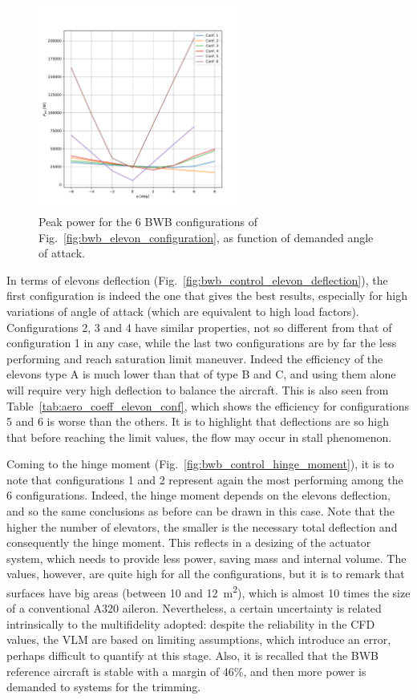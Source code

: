 \begin{figure}[!h]
	\centering
	\includegraphics[keepaspectratio, width=0.6\textwidth]{images/chap4/bwb_control_peak_power}
	\caption{Peak power for the 6 BWB configurations of Fig.~\ref{fig:bwb_elevon_configuration}, as function of demanded angle of attack.}
	\label{fig:bwb_control_peak_power}
\end{figure}

In terms of elevons deflection (Fig.~\ref{fig:bwb_control_elevon_deflection}), the first configuration is indeed the one that gives the best results, especially for high variations of angle of attack (which are equivalent to high load factors). 
Configurations 2, 3 and 4 have similar properties, not so different from that of configuration 1 in any case, while the last two configurations are by far the less performing and reach saturation limit maneuver. 
Indeed the efficiency of the elevons type A is much lower than that of type B and C, and using them alone will require very high deflection to balance the aircraft. 
This is also seen from Table~\ref{tab:aero_coeff_elevon_conf}, which shows the efficiency for configurations 5 and 6 is worse than the others.
It is to highlight that deflections are so high that before reaching the limit values, the flow may occur in stall phenomenon.

Coming to the hinge moment (Fig.~\ref{fig:bwb_control_hinge_moment}), it is to note that configurations 1 and 2 represent again the most performing among the 6 configurations. 
Indeed, the hinge moment depends on the elevons deflection, and so the same conclusions as before can be drawn in this case. 
Note that the higher the number of elevators, the smaller is the necessary total deflection and consequently the hinge moment. 
This reflects in a desizing of the actuator system, which needs to provide less power, saving mass and internal volume. 
The values, however, are quite high for all the configurations, but it is to remark that surfaces have big areas (between 10 and 12~\si{\square\meter}), which is almost 10 times the size of a conventional A320 aileron. 
Nevertheless, a certain uncertainty is related intrinsically to the multifidelity adopted: despite the reliability in the CFD values, the VLM are based on limiting assumptions, which introduce an error, perhaps difficult to quantify at this stage. 
Also, it is recalled that the BWB reference aircraft is stable with a margin of 46\%, and then more power is demanded to systems for the trimming.

